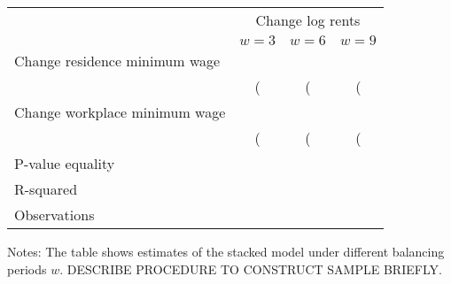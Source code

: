 \begin{table}[]
    \caption{Effect of increase in federal MW to \$9 in January 2020}
    \label{tab:stacked}
    \centering

    \begin{table}[]
        \begin{tabular}{@{}lccc@{}}
        \toprule
                                      & \multicolumn{3}{c}{Change log rents} \\ \cmidrule(l){2-4} 
                                      & $w=3$      & $w=6$     & $w=9 $      \\ \midrule
        Change residence minimum wage & #4#        & #4#       &  #4#        \\
                                      & (#4#)      & (#4#)     & (#4#)       \\
        Change workplace minimum wage & #4#        & #4#       & #4#         \\
                                      & (#4#)      & (#4#)     & (#4#)       \\ \midrule
        P-value equality              & #4#        & #4#       & #4#         \\
        R-squared                     & #4#        & #4#       & #4#         \\
        Observations                  & #0,#       & #0,#      & #0,#        \\ \bottomrule
        \end{tabular}
    \end{table}
    
    \begin{minipage}{.95\textwidth} \footnotesize
        \vspace{2mm}
        Notes: The table shows estimates of the stacked model under different balancing
        periods $w$.
        DESCRIBE PROCEDURE TO CONSTRUCT SAMPLE BRIEFLY.
    \end{minipage}
\end{table}
